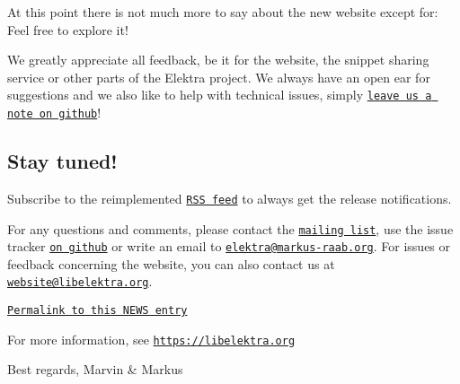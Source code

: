At this point there is not much more to say about the new website except for\+: Feel free to explore it!

We greatly appreciate all feedback, be it for the website, the snippet sharing service or other parts of the Elektra project. We always have an open ear for suggestions and we also like to help with technical issues, simply \href{https://bugs.libelektra.org}{\tt leave us a note on github}!

\subsection*{Stay tuned!}

Subscribe to the reimplemented \href{https://www.libelektra.org/news/feed.rss}{\tt R\+SS feed} to always get the release notifications.

For any questions and comments, please contact the \href{https://lists.sourceforge.net/lists/listinfo/registry-list}{\tt mailing list}, use the issue tracker \href{https://bugs.libelektra.org}{\tt on github} or write an email to \href{mailto:elektra@markus-raab.org}{\tt elektra@markus-\/raab.\+org}. For issues or feedback concerning the website, you can also contact us at \href{mailto:website@libelektra.org}{\tt website@libelektra.\+org}.

\href{https://www.libelektra.org/news/website-release}{\tt Permalink to this N\+E\+WS entry}

For more information, see \href{https://libelektra.org}{\tt https\+://libelektra.\+org}

Best regards, Marvin \& Markus 